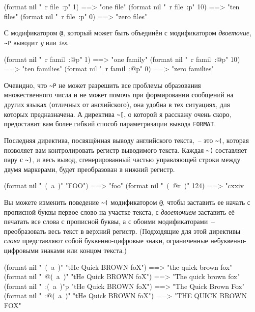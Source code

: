 \begin{myverb}
(format nil "~r file~:p" 1)  ==> "one file"
(format nil "~r file~:p" 10) ==> "ten files"
(format nil "~r file~:p" 0)  ==> "zero files"
\end{myverb}

С модификатором \lstinline!@!, который может быть объединён с модификатором
\textit{двоеточие}, \lstinline!~P! выводит \textit{y} или \textit{ies}.

\begin{myverb}
(format nil "~r famil~:@p" 1)  ==> "one family"
(format nil "~r famil~:@p" 10) ==> "ten families"
(format nil "~r famil~:@p" 0)  ==> "zero families"
\end{myverb}

Очевидно, что \lstinline!~P! не может разрешить все проблемы образования множественного
числа и не может помочь при формировании сообщений на других языках (отличных от
английского), она удобна в тех ситуациях, для которых предназначена. А директива
\lstinline!~[!, о которой я расскажу очень скоро, предоставит вам более гибкий способ
параметризации вывода \lstinline{FORMAT}.

Последняя директива, посвящённая выводу английского текста,~-- это \lstinline!~(!, которая
позволяет вам контролировать регистр выводимого текста. Каждая \lstinline!~(! составляет
пару с \lstinline!~)!, и весь вывод, сгенерированный частью управляющей строки между двумя
маркерами, будет преобразован в нижний регистр.

\begin{myverb}
(format nil "~(~a~)" "FOO") ==> "foo"
(format nil "~(~@r~)" 124)  ==> "cxxiv
\end{myverb}

Вы можете изменить поведение \lstinline!~(! модификатором \lstinline!@!, чтобы заставить
ее начать с прописной буквы первое слово на участке текста, с \textit{двоеточием}
заставить её печатать все слова с прописной буквы, а с обоими модификаторами~--
преобразовать весь текст в верхний регистр. (Подходящие для этой директивы \textit{слова}
представляют собой буквенно-цифровые знаки, ограниченные небуквенно-цифровыми знаками или
концом текста.)

\begin{myverb}
(format nil "~(~a~)" "tHe Quick BROWN foX")   ==> "the quick brown fox"
(format nil "~@(~a~)" "tHe Quick BROWN foX")  ==> "The quick brown fox"
(format nil "~:(~a~)"p "tHe Quick BROWN foX")  ==> "The Quick Brown Fox"
(format nil "~:@(~a~)" "tHe Quick BROWN foX") ==> "THE QUICK BROWN FOX"
\end{myverb}

